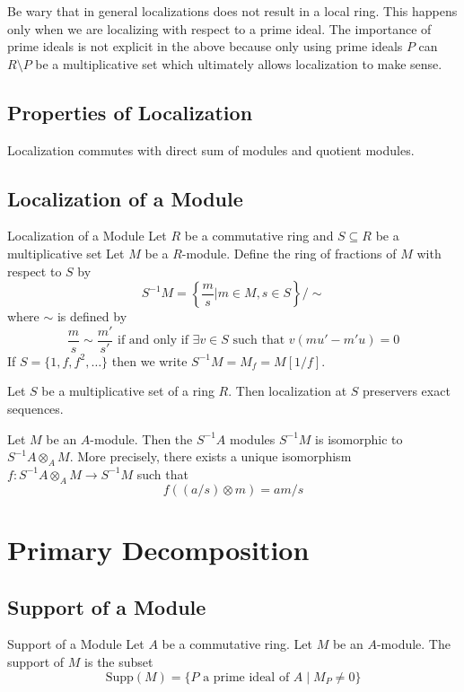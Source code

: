 \documentclass[a4paper]{article}
\begin{document}
Be wary that in general localizations does not result in a local ring. This happens only when we are localizing with respect to a prime ideal. The importance of prime ideals is not explicit in the above because only using prime ideals $P$ can $R\setminus P$ be a multiplicative set which ultimately allows localization to make sense. 

\subsection{Properties of Localization}
\begin{prp}{}{} Localization commutes with direct sum of modules and quotient modules. 
\end{prp}

\subsection{Localization of a Module}
\begin{defn}{Localization of a Module}{} Let $R$ be a commutative ring and $S\subseteq R$ be a multiplicative set Let $M$ be a $R$-module. Define the ring of fractions of $M$ with respect to $S$ by $$S^{-1}M=\left\{\frac{m}{s}|m\in M,s\in S\right\}/\sim$$ where $\sim$ is defined by $$\frac{m}{s}\sim\frac{m'}{s'}\text{ if and only if }\exists v\in S\text{ such that }v(mu'-m'u)=0$$
If $S=\{1,f,f^2,\dots\}$ then we write $S^{-1}M=M_f=M[1/f]$. 
\end{defn}

\begin{prp}{}{} Let $S$ be a multiplicative set of a ring $R$. Then localization at $S$ preservers exact sequences. 
\end{prp}

\begin{prp}{}{} Let $M$ be an $A$-module. Then the $S^{-1}A$ modules $S^{-1}M$ is isomorphic to $S^{-1}A\otimes_AM$. More precisely, there exists a unique isomorphism $f:S^{-1}A\otimes_AM\to S^{-1}M$ such that $$f((a/s)\otimes m)=am/s$$
\end{prp}

\pagebreak
\section{Primary Decomposition}
\subsection{Support of a Module}
\begin{defn}{Support of a Module}{} Let $A$ be a commutative ring. Let $M$ be an $A$-module. The support of $M$ is the subset $$\text{Supp}(M)=\{P\text{ a prime ideal of }A\;|\;M_P\neq 0\}$$
\end{defn}
\end{document}
